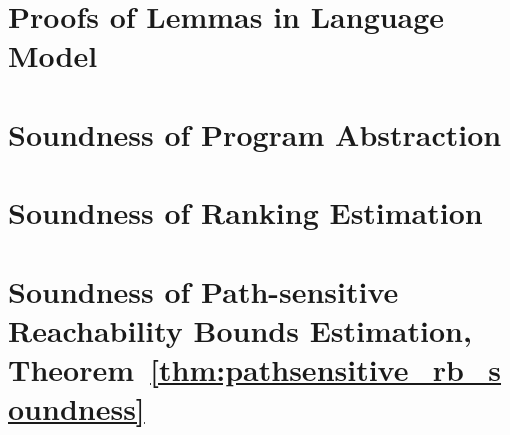 \section{Proofs of Lemmas in Language Model}
\label{apdx:lem_language}

\clearpage
\section{Soundness of Program Abstraction}
\label{apdx:abs_sound}

\clearpage
\section{Soundness of Ranking Estimation}
\label{apdx:pathinsensitive_rb_soundness}

\clearpage
\section{Soundness of Path-sensitive Reachability Bounds Estimation, Theorem~\ref{thm:pathsensitive_rb_soundness}}
\label{apdx:pathsensitive_rb_soundness}

